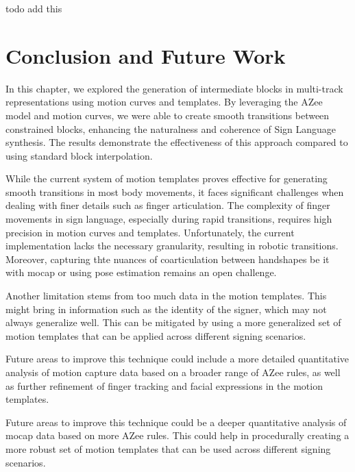 \documentclass[../../main.tex]{subfiles}
\begin{document}
todo add this

\section{Conclusion and Future Work}
\label{ch:intermediate_blocks_pose_correction:conclusion_and_future_work}

In this chapter, we explored the generation of intermediate blocks in multi-track representations using motion curves and templates. By leveraging the AZee model and motion curves, we were able to create smooth transitions between constrained blocks, enhancing the naturalness and coherence of Sign Language synthesis. The results demonstrate the effectiveness of this approach compared to using standard block interpolation. 

While the current system of motion templates proves effective for generating smooth transitions in most body movements, it faces significant challenges when dealing with finer details such as finger articulation. The complexity of finger movements in sign language, especially during rapid transitions, requires high precision in motion curves and templates. Unfortunately, the current implementation lacks the necessary granularity, resulting in robotic transitions. Moreover, capturing thte nuances of coarticulation between handshapes be it with mocap or using pose estimation remains an open challenge.

Another limitation stems from too much data in the motion templates. This might bring in information such as the identity of the signer, which may not always generalize well. This can be mitigated by using a more generalized set of motion templates that can be applied across different signing scenarios.

Future areas to improve this technique could include a more detailed quantitative analysis of motion capture data based on a broader range of AZee rules, as well as further refinement of finger tracking and facial expressions in the motion templates.

Future areas to improve this technique could be a deeper quantitative analysis of mocap data based on more AZee rules. This could help in procedurally creating a more robust set of motion templates that can be used across different signing scenarios.
\end{document}

